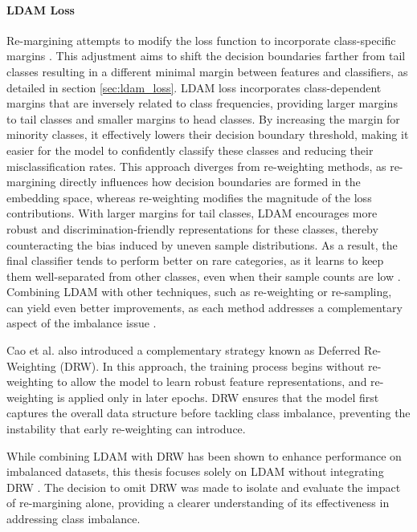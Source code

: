 \paragraph{LDAM Loss}
Re-margining attempts to modify the loss function to incorporate class-specific margins \cite{zhang2023deep}. This adjustment aims to shift the decision boundaries farther from tail classes resulting in a different minimal margin between features and classifiers, as detailed in section \ref{sec:ldam_loss}. LDAM loss \cite{cao2019learningimbalanceddatasetslabeldistributionaware} incorporates class-dependent margins that are inversely related to class frequencies, providing larger margins to tail classes and smaller margins to head classes. By increasing the margin for minority classes, it effectively lowers their decision boundary threshold, making it easier for the model to confidently classify these classes and reducing their misclassification rates. This approach diverges from re-weighting methods, as re-margining directly influences how decision boundaries are formed in the embedding space, whereas re-weighting modifies the magnitude of the loss contributions. With larger margins for tail classes, LDAM encourages more robust and discrimination-friendly representations for these classes, thereby counteracting the bias induced by uneven sample distributions. As a result, the final classifier tends to perform better on rare categories, as it learns to keep them well-separated from other classes, even when their sample counts are low \cite{cao2019learningimbalanceddatasetslabeldistributionaware}. Combining LDAM with other techniques, such as re-weighting or re-sampling, can yield even better improvements, as each method addresses a complementary aspect of the imbalance issue \cite{cao2019learningimbalanceddatasetslabeldistributionaware}. 

Cao et al. \cite{cao2019learningimbalanceddatasetslabeldistributionaware} also introduced a complementary strategy known as Deferred Re-Weighting (DRW). In this approach, the training process begins without re-weighting to allow the model to learn robust feature representations, and re-weighting is applied only in later epochs. DRW ensures that the model first captures the overall data structure before tackling class imbalance, preventing the instability that early re-weighting can introduce.

While combining LDAM with DRW has been shown to enhance performance on imbalanced datasets, this thesis focuses solely on LDAM without integrating DRW \cite{cao2019learningimbalanceddatasetslabeldistributionaware}. The decision to omit DRW was made to isolate and evaluate the impact of re-margining alone, providing a clearer understanding of its effectiveness in addressing class imbalance.

